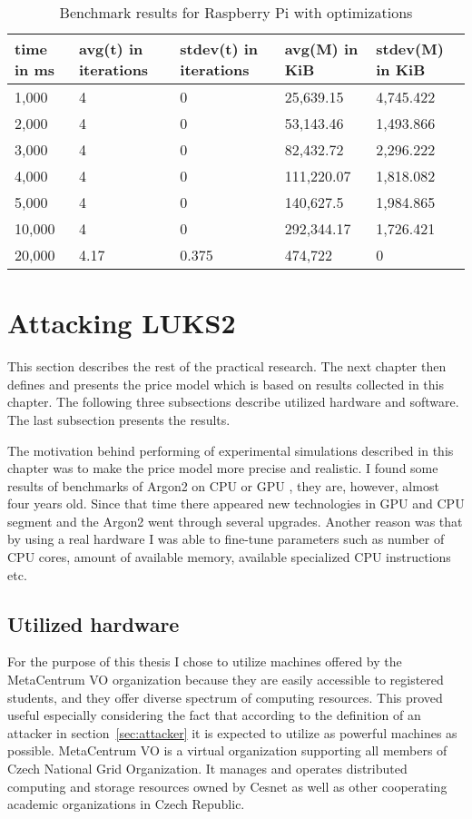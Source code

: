 \documentclass[nolof,digital]{fithesis3}
\begin{document}
\noindent
\begin{table}
\caption{Benchmark results for Raspberry Pi with optimizations}
\label{tab:r4c1go}
\begin{tabularx}{\textwidth}{| X | X | X | X | X |}
\hline
time in ms & avg(t)  in iterations & stdev(t) in iterations & avg(M) in KiB & stdev(M) in KiB\\
\hline
1,000 & 4 & 0 & 25,639.15 & 4,745.422\\
\hline
2,000 & 4 & 0 & 53,143.46 & 1,493.866\\
\hline
3,000 & 4 & 0 & 82,432.72 & 2,296.222\\
\hline
4,000 & 4 & 0 & 111,220.07 & 1,818.082\\
\hline
5,000 & 4 & 0 & 140,627.5 & 1,984.865\\
\hline
10,000 & 4 & 0 & 292,344.17 & 1,726.421\\
\hline
20,000 & 4.17 & 0.375 & 474,722 & 0\\
\hline
\end{tabularx}
\end{table}


\FloatBarrier

\section{Attacking LUKS2}
\label{sec:attack}
This section describes the rest of the practical research. The next chapter then defines and presents the price model which is based on results collected in this chapter. The following three subsections describe utilized hardware and software. The last subsection presents the results.

The motivation behind performing of experimental simulations described in this chapter was to make the price model more precise and realistic. I found some results of benchmarks of Argon2 on CPU or GPU \parencite{argon2gpuold}, they are, however, almost four years old. Since that time there appeared new technologies in GPU and CPU segment and the Argon2 went through several upgrades. Another reason was that by using a real hardware I was able to fine-tune parameters such as number of CPU cores, amount of available memory, available specialized CPU instructions etc.

\subsection{Utilized hardware}
For the purpose of this thesis I chose to utilize machines offered by the MetaCentrum VO organization because they are easily accessible to registered students, and they offer diverse spectrum of computing resources. This proved useful especially considering the fact that according to the definition of an attacker in section~\ref{sec:attacker} it is expected to utilize as powerful machines as possible. MetaCentrum VO is a virtual organization supporting all members of Czech National Grid Organization. It manages and operates distributed  computing and storage resources owned by Cesnet as well as other cooperating academic organizations in Czech Republic.
\end{document}
